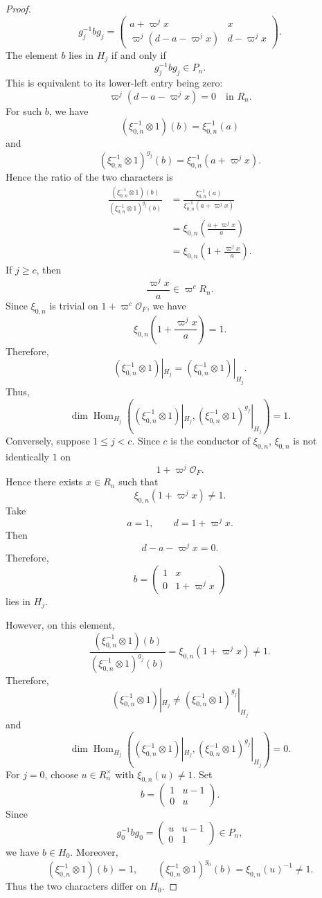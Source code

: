 \documentclass[11pt]{amsart}
\theoremstyle{definition}
\numberwithin{equation}{section}
\begin{document}
\begin{proof}
\[		g_j^{-1} b g_j = \begin{pmatrix} a + \varpi^j x & x \\ \varpi^j(d - a - \varpi^j x) & d - \varpi^j x \end{pmatrix}.
		\]
		The element \(b\) lies in \(H_j\) if and only if
		\[
		g_j^{-1} b g_j \in P_n.
		\]
		This is equivalent to its lower-left entry being zero:
		\[
		\varpi^j(d - a - \varpi^j x) = 0 \quad \text{in } R_n.
		\]
		For such \(b\), we have
		\[
		(\xi_{0,n}^{-1}\otimes1)(b) = \xi_{0,n}^{-1}(a)
		\]
		and
		\[
		(\xi_{0,n}^{-1}\otimes1)^{g_j}(b) = \xi_{0,n}^{-1}(a + \varpi^j x).
		\]
		Hence the ratio of the two characters is
		\begin{align*}
			\frac{(\xi_{0,n}^{-1}\otimes1)(b)}{(\xi_{0,n}^{-1}\otimes1)^{g_j}(b)} &= \frac{\xi_{0,n}^{-1}(a)}{\xi_{0,n}^{-1}(a + \varpi^j x)} \\
			&= \xi_{0,n} \left( \frac{a + \varpi^j x}{a} \right) \\
			&= \xi_{0,n} \left( 1 + \frac{\varpi^j x}{a} \right).
		\end{align*}
		If \(j \geq c\), then
		\[
		\frac{\varpi^j x}{a} \in \varpi^c R_n.
		\]
		Since \(\xi_{0,n}\) is trivial on \(1 + \varpi^c \mathcal{O}_F\), we have
		\[
		\xi_{0,n} \left( 1 + \frac{\varpi^j x}{a} \right) = 1.
		\]
		Therefore,
		\[
		(\xi_{0,n}^{-1} \otimes 1)|_{H_j} = (\xi_{0,n}^{-1} \otimes 1)|_{H_j}.
		\]
		Thus,
		\[
		\dim \operatorname{Hom}_{H_j}((\xi_{0,n}^{-1} \otimes 1)|_{H_j}, (\xi_{0,n}^{-1} \otimes 1)^{g_j}|_{H_j}) = 1.
		\]
		Conversely, suppose \(1\le j < c\). Since \(c\) is the conductor of \(\xi_{0,n}\), \(\xi_{0,n}\) is not identically \(1\) on
		\[
		1 + \varpi^j \mathcal{O}_F.
		\]
		Hence there exists \(x \in R_n\) such that
		\[
		\xi_{0,n}(1 + \varpi^j x) \neq 1.
		\]
		Take
		\[
		a = 1, \qquad d = 1 + \varpi^j x.
		\]
		Then
		\[
		d - a - \varpi^j x = 0.
		\]
		Therefore,
		\[
		b = \begin{pmatrix} 1 & x \\ 0 & 1 + \varpi^j x \end{pmatrix}
		\]
		lies in \(H_j\).
		
		
		However, on this element,
		\[
		\frac{(\xi_{0,n}^{-1} \otimes 1)(b)}{(\xi_{0,n}^{-1} \otimes 1)^{g_j}(b)} = \xi_{0,n}(1 + \varpi^j x) \neq 1.
		\]
		Therefore,
		\[
		(\xi_{0,n}^{-1} \otimes 1)|_{H_j} \neq (\xi_{0,n}^{-1} \otimes 1)^{g_j}|_{H_j}
		\]
		and
		\[
		\dim \operatorname{Hom}_{H_j}((\xi_{0,n}^{-1} \otimes 1)|_{H_j}, (\xi_{0,n}^{-1} \otimes 1)^{g_j}|_{H_j}) = 0.
		\]
        For $j=0$, choose $u\in R_n^\times$ with $\xi_{0,n}(u)\ne1$. Set\[b=\begin{pmatrix}1&u-1\\0&u\end{pmatrix}.\] Since \[g_0^{-1}bg_0=\begin{pmatrix}u&u-1\\0&1\end{pmatrix}\in P_n,\]we have $b\in H_0$. Moreover,\[(\xi_{0,n}^{-1}\otimes1)(b)=1,\qquad(\xi_{0,n}^{-1}\otimes1)^{g_0}(b)=\xi_{0,n}(u)^{-1}\ne1.\]Thus the two characters differ on $H_0$.




\end{proof}
\end{document}
